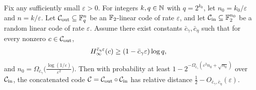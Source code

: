\begin{theorem}
  \label{thm:min-entropy}
  Fix any sufficiently small $\varepsilon > 0$. For integers $k,q \in \mathbb{N}$ with
  $q = 2^{k_0}$, let $n_0 = k_0/\varepsilon$ and $n = k/\varepsilon$. Let
  $\mathcal{C}_{\mathrm{out}} \subseteq \mathbb{F}_q^n$ be an $\mathbb{F}_2$-linear code of rate $\varepsilon$, and let
  $\mathcal{C}_{\mathrm{in}} \subseteq \mathbb{F}_2^{n_0}$ be a random linear code of rate $\varepsilon$.
  Assume there exist constants $\bar c_\gamma, \bar c_\eta$ such that for every
  nonzero $c \in \mathcal{C}_{\mathrm{out}}$,
  \[
    H_\infty^{\bar c_\eta\varepsilon}(c)\geq (1 - \bar c_\gamma\varepsilon)\log q,
  \]
  and $n_0 = \Omega_{\bar c_\gamma}\big(\frac{\log(1/\varepsilon)}{\varepsilon^2}\big)$.
  Then with probability at least $1 - 2^{-\Omega_{\bar c_\gamma}(\varepsilon^2 n_0
  + \sqrt{n_0})}$ over $\mathcal{C}_{\mathrm{in}}$, the concatenated code $\mathcal{C} = \mathcal{C}_{\mathrm{out}}\circ\mathcal{C}_{\mathrm{in}}$ has
  relative distance $\frac12 - O_{\bar c_\gamma,\bar c_\eta}(\varepsilon)$.
\end{theorem}
